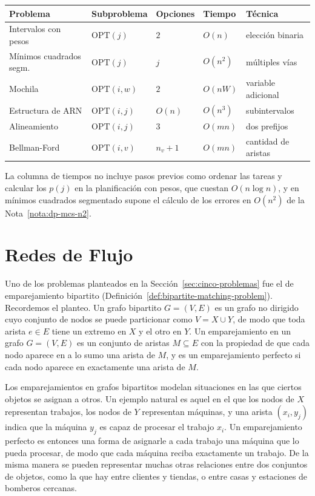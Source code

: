 \documentclass[12pt, spanish, oneside, openany]{book}
\theoremstyle{uprightplain}
\theoremstyle{definition}
\theoremstyle{remark}
\theoremstyle{definition}
\newcommand{\OPT}{\mathrm{OPT}} %
\begin{document}
\begin{center}
\small
\renewcommand{\arraystretch}{1.25}
\begin{tabular}{@{}lllll@{}}
\toprule
\textbf{Problema} & \textbf{Subproblema} & \textbf{Opciones} & \textbf{Tiempo} & \textbf{Técnica}\\
\midrule
Intervalos con pesos & $\OPT(j)$ & $2$ & $O(n)$ & elección binaria\\
Mínimos cuadrados segm. & $\OPT(j)$ & $j$ & $O(n^2)$ & múltiples vías\\
Mochila & $\OPT(i,w)$ & $2$ & $O(nW)$ & variable adicional\\
Estructura de ARN & $\OPT(i,j)$ & $O(n)$ & $O(n^3)$ & subintervalos\\
Alineamiento & $\OPT(i,j)$ & $3$ & $O(mn)$ & dos prefijos\\
Bellman-Ford & $\OPT(i,v)$ & $n_v+1$ & $O(mn)$ & cantidad de aristas\\
\bottomrule
\end{tabular}
\end{center}

La columna de tiempos no incluye pasos previos como ordenar las tareas y calcular los $p(j)$ en la planificación con pesos, que cuestan $O(n\log n)$, y en mínimos cuadrados segmentado supone el cálculo de los errores en $O(n^2)$ de la Nota~\ref{nota:dp-mcs-n2}.

\chapter{Redes de Flujo}
\label{chap:flujo}

Uno de los problemas planteados en la Sección~\ref{sec:cinco-problemas} fue el de emparejamiento bipartito (Definición~\ref{def:bipartite-matching-problem}). Recordemos el planteo. Un grafo bipartito $G=(V,E)$ es un grafo no dirigido cuyo conjunto de nodos se puede particionar como $V=X\cup Y$, de modo que toda arista $e\in E$ tiene un extremo en $X$ y el otro en $Y$. Un emparejamiento en un grafo $G=(V,E)$ es un conjunto de aristas $M\subseteq E$ con la propiedad de que cada nodo aparece en a lo sumo una arista de $M$, y es un emparejamiento perfecto si cada nodo aparece en exactamente una arista de $M$.

Los emparejamientos en grafos bipartitos modelan situaciones en las que ciertos objetos se asignan a otros. Un ejemplo natural es aquel en el que los nodos de $X$ representan trabajos, los nodos de $Y$ representan máquinas, y una arista $(x_i,y_j)$ indica que la máquina $y_j$ es capaz de procesar el trabajo $x_i$. Un emparejamiento perfecto es entonces una forma de asignarle a cada trabajo una máquina que lo pueda procesar, de modo que cada máquina reciba exactamente un trabajo. De la misma manera se pueden representar muchas otras relaciones entre dos conjuntos de objetos, como la que hay entre clientes y tiendas, o entre casas y estaciones de bomberos cercanas.
\end{document}
